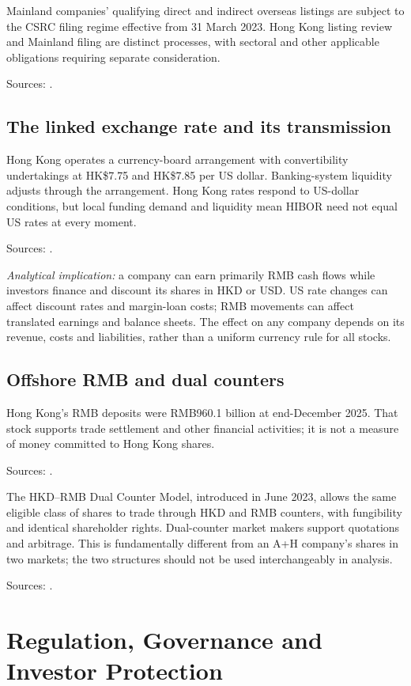 \documentclass[11pt,a4paper]{article}
\newcommand{\source}[1]{\par{\footnotesize\color{ink}Sources: \cite{#1}.}\par}
\begin{document}
Mainland companies' qualifying direct and indirect overseas listings are subject to the CSRC filing regime effective from 31 March 2023. Hong Kong listing review and Mainland filing are distinct processes, with sectoral and other applicable obligations requiring separate consideration.\source{csrc}

\subsection{The linked exchange rate and its transmission}
Hong Kong operates a currency-board arrangement with convertibility undertakings at HK\$7.75 and HK\$7.85 per US dollar. Banking-system liquidity adjusts through the arrangement. Hong Kong rates respond to US-dollar conditions, but local funding demand and liquidity mean HIBOR need not equal US rates at every moment.\source{hkma}

\textit{Analytical implication:} a company can earn primarily RMB cash flows while investors finance and discount its shares in HKD or USD. US rate changes can affect discount rates and margin-loan costs; RMB movements can affect translated earnings and balance sheets. The effect on any company depends on its revenue, costs and liabilities, rather than a uniform currency rule for all stocks.

\subsection{Offshore RMB and dual counters}
Hong Kong's RMB deposits were RMB960.1 billion at end-December 2025. That stock supports trade settlement and other financial activities; it is not a measure of money committed to Hong Kong shares.\source{rmbstats}

The HKD--RMB Dual Counter Model, introduced in June 2023, allows the same eligible class of shares to trade through HKD and RMB counters, with fungibility and identical shareholder rights. Dual-counter market makers support quotations and arbitrage. This is fundamentally different from an A+H company's shares in two markets; the two structures should not be used interchangeably in analysis.\source{dualcounter}

\section{Regulation, Governance and Investor Protection}
\end{document}

